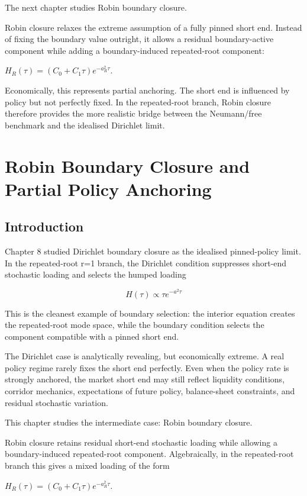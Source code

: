 \documentclass[11pt,oneside]{book}
\begin{document}
The next chapter studies Robin boundary closure.

Robin closure relaxes the extreme assumption of a fully pinned short
end. Instead of fixing the boundary value outright, it allows a residual
boundary-active component while adding a boundary-induced repeated-root
component:

$H_R(\tau)=(C_0+C_1\tau)e^{-a_R^2\tau}$.

Economically, this represents partial anchoring. The short end is
influenced by policy but not perfectly fixed. In the repeated-root
branch, Robin closure therefore provides the more realistic bridge
between the Neumann/free benchmark and the idealised Dirichlet limit.

\chapter{Robin Boundary Closure and Partial Policy Anchoring}\label{chapter-9}

\section{Introduction}\label{introduction-6}

Chapter 8 studied Dirichlet boundary closure as the idealised
pinned-policy limit. In the repeated-root r=1 branch, the Dirichlet
condition suppresses short-end stochastic loading and selects the humped
loading

\[
H(\tau)\propto\tau e^{-a^2\tau}
\]

This is the cleanest example of boundary selection: the interior
equation creates the repeated-root mode space, while the boundary
condition selects the component compatible with a pinned short end.

The Dirichlet case is analytically revealing, but economically extreme.
A real policy regime rarely fixes the short end perfectly. Even when the
policy rate is strongly anchored, the market short end may still reflect
liquidity conditions, corridor mechanics, expectations of future policy,
balance-sheet constraints, and residual stochastic variation.

This chapter studies the intermediate case: Robin boundary closure.

Robin closure retains residual short-end stochastic loading while
allowing a boundary-induced repeated-root component. Algebraically, in
the repeated-root branch this gives a mixed loading of the form

$H_R(\tau)=(C_0+C_1\tau)e^{-a_R^2\tau}$.
\end{document}
